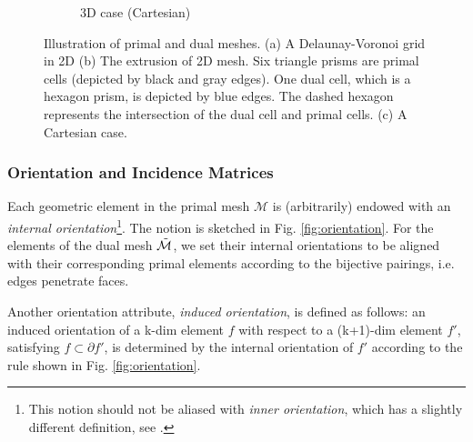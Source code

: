 \documentclass{article}
\begin{document}
\begin{figure}
\begin{subfigure}[b]{0.35\textwidth}
        \caption{3D case (Cartesian)}
        \label{fig:cartesian}
    \end{subfigure}
    \hfill
    \caption{Illustration of primal and dual meshes. (a) A Delaunay-Voronoi grid in 2D (b) The extrusion of 2D mesh. Six triangle prisms are primal cells (depicted by black and gray edges). One dual cell, which is a hexagon prism, is depicted by blue edges. The dashed hexagon represents the intersection of the dual cell and primal cells. (c) A Cartesian case.}
    \label{fig:illustration_primal_dual}
\end{figure}

\subsubsection{Orientation and Incidence Matrices}
Each geometric element in the primal mesh $\mathcal{M}$ is (arbitrarily) endowed with an \emph{internal orientation}\footnote{This notion should not be aliased with \emph{inner orientation}, which has a slightly different definition, see \cite{tonti_2002}.}. The notion is sketched in Fig. \ref{fig:orientation}. For the elements of the dual mesh $\Tilde{\mathcal{M}}$, we set their internal orientations to be aligned with their corresponding primal elements according to the bijective pairings, i.e. edges penetrate faces.

Another orientation attribute, \emph{induced orientation}, is defined as follows: an induced orientation of a k-dim element $f$ with respect to a (k+1)-dim element $f'$, satisfying $f \subset \partial f' $, is determined by the internal orientation of $f'$ according to the rule shown in Fig. \ref{fig:orientation}. 
\end{document}
